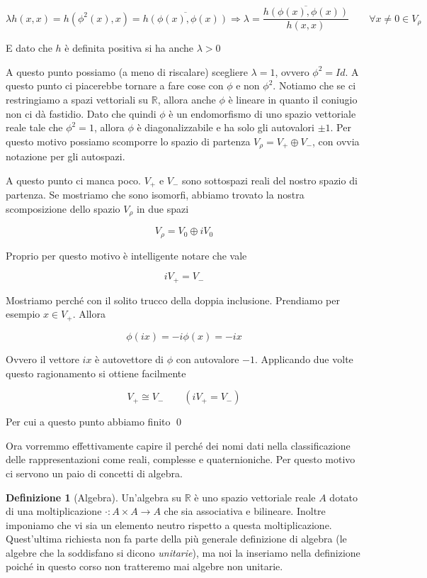 \documentclass[11pt]{article}
\theoremstyle{plain}
\theoremstyle{definition}
\newtheorem{defn}{Definizione}[section]
\theoremstyle{remark}
\newcommand{\R}{\mathbb{R}}
\begin{document}
\[\lambda h(x, x) = h (\phi^2(x), x) = \overline{h(\phi(x), \phi(x))} \Rightarrow \lambda = \dfrac{\overline{h(\phi(x), \phi(x))}}{ h(x,x)} \qquad \forall x \neq 0 \in V_\rho\]

E dato che $h $ è definita positiva si ha anche $\lambda > 0$


A questo punto possiamo (a meno di riscalare) scegliere $\lambda = 1$, ovvero $\phi^2 = Id$. A questo punto ci piacerebbe tornare a fare cose con $\phi$ e non $\phi^2$. Notiamo che se ci restringiamo a spazi vettoriali su $\R$, allora anche $\phi$ è lineare in quanto il coniugio non ci dà fastidio. Dato che quindi $\phi$ è un endomorfismo di uno spazio vettoriale reale tale che $\phi^2=1$, allora $\phi$ è diagonalizzabile e ha solo gli autovalori $\pm 1$.  Per questo motivo possiamo scomporre lo spazio di partenza $V_\rho = V_+ \oplus V_-$, con ovvia notazione per gli autospazi.


A questo punto ci manca poco. $V_+$ e $V_-$ sono sottospazi reali del nostro spazio di partenza. Se mostriamo che sono isomorfi, abbiamo trovato la nostra scomposizione dello spazio $V_\rho$ in due spazi 

\[ V_\rho = V_0 \oplus iV_0\]


Proprio per questo motivo è intelligente notare che vale

\[ i V_+ = V_- \]

Mostriamo perché con il solito trucco della doppia inclusione. Prendiamo per esempio $x \in V_+$. Allora 

\[ \phi(ix) = - i \phi(x) = -i x \]

Ovvero il vettore $ix$ è autovettore di $\phi$ con autovalore $-1$. Applicando due volte questo ragionamento si ottiene facilmente

\[ V_+ \cong V_- \qquad (i V_+ = V_-)\]

Per cui a questo punto abbiamo finito \qed



Ora vorremmo effettivamente capire il perché dei nomi dati nella classificazione delle rappresentazioni come reali, complesse e quaternioniche. Per questo motivo ci servono un paio di concetti di algebra.


\begin{defn}[Algebra]
Un'algebra su $\R$ è uno spazio vettoriale reale $A$ dotato di una moltiplicazione $\cdot : A \times A \to A$ che sia associativa e bilineare.
Inoltre imponiamo che vi sia un elemento neutro rispetto a questa moltiplicazione. Quest'ultima richiesta non fa parte della
più generale definizione di algebra (le algebre che la soddisfano si dicono \emph{unitarie}), ma noi la inseriamo nella definizione
poiché in questo corso non tratteremo mai algebre non unitarie.
\end{defn}
\end{document}
